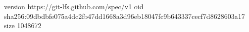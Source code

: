 version https://git-lfs.github.com/spec/v1
oid sha256:09dbdbfe075a4dc2fb47dd1668a3d96eb18047fc9b643337cecf7d8628603a17
size 1048672
